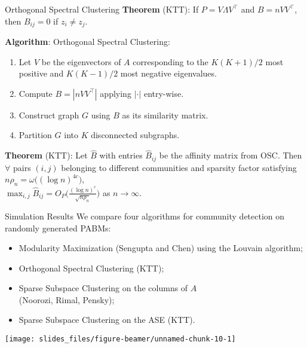 \documentclass[
  ignorenonframetext,
]{beamer}
\providecommand{\tightlist}{%
  \setlength{\itemsep}{0pt}\setlength{\parskip}{0pt}}
\begin{document}
\begin{frame}{Orthogonal Spectral Clustering}
\protect\hypertarget{orthogonal-spectral-clustering}{}
\textbf{Theorem} (KTT): If \(P = V \Lambda V^\top\) and
\(B = n V V^\top\),\\
then \(B_{ij} = 0\) if \(z_i \neq z_j\).

\textbf{Algorithm}: Orthogonal Spectral Clustering:

\begin{enumerate}
\tightlist
\item
  Let \(V\) be the eigenvectors of \(A\) corresponding to the
  \(K (K+1)/2\) most positive and \(K (K-1) / 2\) most negative
  eigenvalues.
\item
  Compute \(B = |n V V^\top|\) applying \(|\cdot|\) entry-wise.
\item
  Construct graph \(G\) using \(B\) as its similarity matrix.
\item
  Partition \(G\) into \(K\) disconnected subgraphs.
\end{enumerate}

\textbf{Theorem} (KTT): Let \(\hat{B}\) with entries \(\hat{B}_{ij}\) be
the affinity matrix from OSC. Then \(\forall\) pairs \((i, j)\)
belonging to different communities and sparsity factor satisfying
\(n \rho_n = \omega\big((\log n)^{4c}\big)\),\\
\(\max_{i, j} \hat{B}_{ij} = O_P \Big( \frac{(\log n)^c}{\sqrt{n \rho_n}} \Big)\)
as \(n \to \infty\).
\end{frame}

\begin{frame}{Simulation Results}
\protect\hypertarget{simulation-results}{}
We compare four algorithms for community detection on randomly generated
PABMs:

\begin{itemize}
\tightlist
\item
  Modularity Maximization (Sengupta and Chen) using the Louvain
  algorithm;
\item
  Orthogonal Spectral Clustering (KTT);
\item
  Sparse Subspace Clustering on the columns of \(A\)\\
  (Noorozi, Rimal, Pensky);
\item
  Sparse Subspace Clustering on the ASE (KTT).
\end{itemize}

\begin{center}\texttt{[image: slides\_files/figure-beamer/unnamed-chunk-10-1]} \end{center}
\end{frame}
\end{document}
